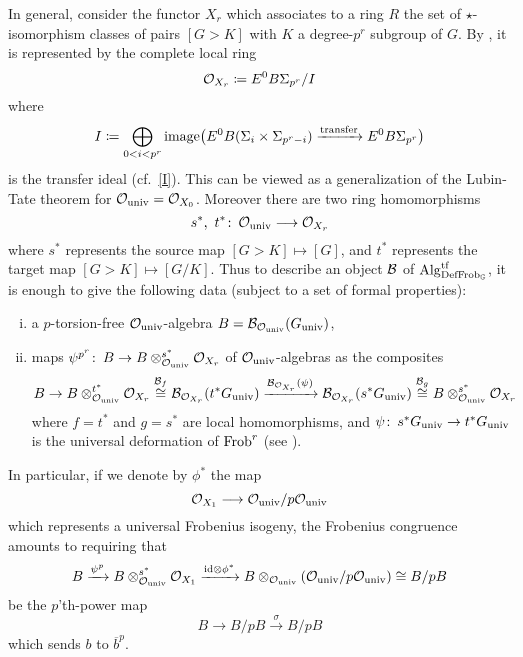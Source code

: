 \documentclass{gtpart}
\theoremstyle{definition}
\theoremstyle{remark}
\def\co{\colon\thinspace}
\newcommand{\mb}[1]{\mathbb{#1}}
\newcommand{\CB}{{\cal B}}
\newcommand{\CO}{{\cal O}}
\newcommand{\Alg}{{\rm Alg}}
\newcommand{\Frob}{{\rm Frob}}
\newcommand{\DF}{{{\rm DefFrob}_\BG}}
\newcommand{\BG}{{\mb G}}
\newcommand{\id}{{\rm id}}
\newcommand{\tf}{{\rm tf}}
\newcommand{\univ}{{\rm univ}}
\newcommand{\ce}{\coloneqq}
\numberwithin{equation}{section}
\numberwithin{thm}{section}
\begin{document}
In general, consider the functor $X_r$ which associates to a ring $R$ 
the set of $\star$-isomorphism classes of pairs $[G>K]$ with $K$ a 
degree-$p^r$ subgroup of $G$.  By \cite[Theorem 9.2]{Str98}, it is 
represented by the complete local ring 
\[
 \CO_{X_r} \ce E^0 B\Sigma_{p^r}/I 
\]
where 
\[
 I \ce \bigoplus_{0<i<p^r} {\rm image} 
 \big( E^0 B(\Sigma_i \times \Sigma_{p^r-i}) 
 \xrightarrow{\rm transfer} E^0 B\Sigma_{p^r} \big) 
\]
is the transfer ideal (cf.~\eqref{I}).  This can be viewed as a 
generalization of the Lubin-Tate theorem for $\CO_\univ = \CO_{X_0}$.  
Moreover there are two ring homomorphisms 
\[
 s^*, ~ t^* \co \CO_\univ \longrightarrow \CO_{X_r} 
\]
where $s^*$ represents the source map $[G>K] \mapsto [G]$, and $t^*$ 
represents the target map $[G>K] \mapsto [G/K]$.  Thus to describe an 
object $\CB$ of $\Alg_\DF^\tf$, it is enough to give the following data 
(subject to a set of formal properties): 
\begin{enumerate}[(i)]
 \item a $p$-torsion-free $\CO_\univ$-algebra 
 $B = \CB_{\CO_\univ}(G_\univ)$, 

 \item maps $\psi^{p^r} \co B \to B \otimes_{\CO_\univ}^{s^*} \CO_{X_r}$ 
 of $\CO_\univ$-algebras as the composites 
 \[
  B \to B \otimes_{\CO_\univ}^{t^*} \CO_{X_r} \stackrel{\CB_f}{\cong} 
  \CB_{\CO_{X_r}} (t^*G_\univ) \xrightarrow{\CB_{\CO_{X_r}} (\psi)} 
  \CB_{\CO_{X_r}} (s^*G_\univ) \stackrel{\CB_g}{\cong} 
  B \otimes_{\CO_\univ}^{s^*} \CO_{X_r} 
 \]
 where $f = t^*$ and $g = s^*$ are local homomorphisms, and 
 $\psi \co s^*G_\univ \to t^*G_\univ$ is the universal deformation of 
 $\Frob^r$ (see \cite[Section 13]{Str97}).  
\end{enumerate}
In particular, if we denote by $\phi^*$ the map 
\begin{equation}
\label{sigma}
 \CO_{X_1} \longrightarrow \CO_\univ/p\CO_\univ 
\end{equation}
which represents a universal Frobenius isogeny, the Frobenius congruence 
amounts to requiring that 
\begin{equation}
\label{frobcong}
 B \xrightarrow{\psi^p} B \otimes_{\CO_\univ}^{s^*} \CO_{X_1} 
 \xrightarrow{\id \otimes \phi^*} 
 B \otimes_{\CO_\univ} (\CO_\univ/p\CO_\univ) \cong B/pB 
\end{equation}
be the $p$'th-power map 
\[
 B \to B/pB \xrightarrow{\sigma} B/pB 
\]
which sends $b$ to $\overline{b}^p$.  
\end{document}
